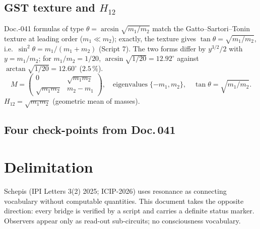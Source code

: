 \subsection{GST texture and $H_{12}$ \B}

Doc.-041 formulas of type $\theta=\arcsin\!\sqrt{m_1/m_2}$ match the
Gatto–Sartori–Tonin texture at leading order ($m_1 \ll m_2$); exactly, the texture gives
$\tan\theta = \sqrt{m_1/m_2}$, i.e.\ $\sin^2\theta = m_1/(m_1+m_2)$ (Script 7).
The two forms differ by $y^{3/2}/2$ with $y = m_1/m_2$; for $m_1/m_2 = 1/20$,
$\arcsin\sqrt{1/20} = 12.92^\circ$ against $\arctan\sqrt{1/20} = 12.60^\circ$ ($2.5\,\%$).
\begin{equation}
  M = \begin{pmatrix}0 & \sqrt{m_1 m_2}\\ \sqrt{m_1 m_2} & m_2-m_1\end{pmatrix},
  \quad \text{eigenvalues}\;\{-m_1,m_2\},\quad \tan\theta=\sqrt{m_1/m_2}.
\end{equation}
$H_{12}=\sqrt{m_1 m_2}$ (geometric mean of masses). \B

\subsection{Four check-points from Doc.\,041}


\section{Delimitation}

\begin{tcolorbox}[warnbox,title={Delimitation from resonance-as-vocabulary}]
Schepis (IPI Letters 3(2) 2025; ICIP-2026) uses resonance as connecting vocabulary
without computable quantities. This document takes the opposite direction: every
bridge is verified by a script and carries a definite status marker. Observers appear
only as read-out sub-circuits; no consciousness vocabulary.
\end{tcolorbox}

